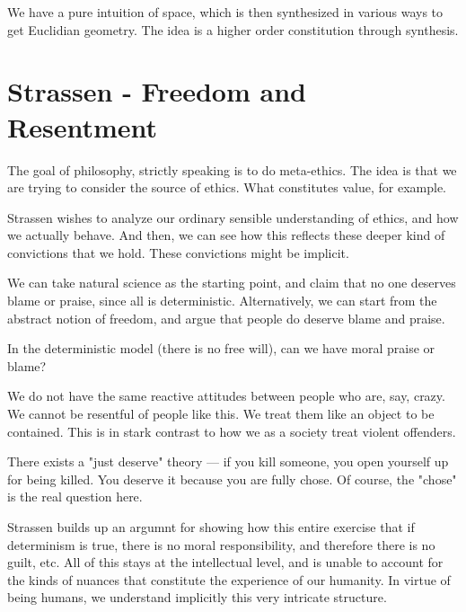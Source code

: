\documentclass[11pt]{book}
\begin{document}
We have a pure intuition of space, which is
then synthesized in various ways to get Euclidian geometry.
The idea is a higher order constitution through synthesis. 

\chapter{Strassen - Freedom and Resentment}

The goal of philosophy, strictly speaking is to do meta-ethics. The idea is 
that we are trying to consider the source of ethics. What constitutes value,
for example. 

Strassen wishes to analyze our ordinary sensible understanding of ethics,
and how we actually behave. And then, we can see how this reflects these
deeper kind of convictions that we hold. These convictions might be implicit.

We can take natural science as the starting point, and claim that no one
deserves blame or praise, since all is deterministic.
Alternatively, we can start from the abstract notion of freedom, and argue that
people do deserve blame and praise.

In the deterministic model (there is no free will), can we have moral praise
or blame?

We do not have the same reactive attitudes between people who are, say, crazy.
We cannot be resentful of people like this. We treat them like an object to be
contained. This is in stark contrast to how we as a society treat violent
offenders.

There exists a "just deserve" theory --- if you kill someone, you open yourself up
for being killed. You deserve it because you are fully chose. Of course,
the "chose" is the real question here.

Strassen builds up an argumnt for showing how this entire exercise that
if determinism is true, there is no moral responsibility, and therefore
there is no guilt, etc. All of this stays at the intellectual level, and
is unable to account for the kinds of nuances that constitute the experience
of our humanity. In virtue of being humans, we understand implicitly this
very intricate structure.
\end{document}
